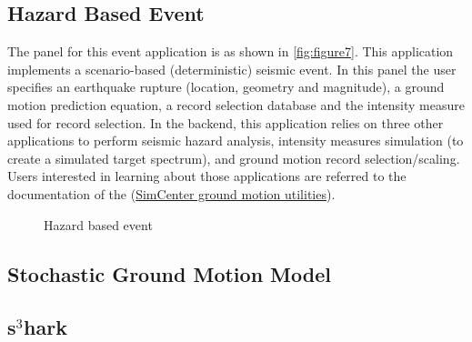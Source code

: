 \subsection{Hazard Based Event}
The panel for this event application is as shown
in \autoref{fig:figure7}.  This application implements a
scenario-based (deterministic) seismic event.  In this panel the user
specifies an earthquake rupture (location, geometry and magnitude), a
ground motion prediction equation, a record selection database and the
intensity measure used for record selection.  In the backend, this
application relies on three other applications to perform seismic
hazard analysis, intensity measures simulation (to create a simulated
target spectrum), and ground motion record selection/scaling.  Users
interested in learning about those applications are referred to the
documentation of the
(\href{https://github.com/NHERI-SimCenter/GroundMotionUtilities/blob/master/Readme.md}{SimCenter
ground motion utilities}).
\begin{figure}[!htbp]
  \caption{Hazard based event}
  \label{fig:figure7}
\end{figure}

\subsection{Stochastic Ground Motion Model}


\subsection{s$^3$hark}


